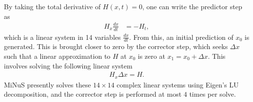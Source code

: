 \documentclass[10pt,conference]{IEEEtran}
\begin{document}
By taking the total derivative of $H(x,t) = 0$, one can write the predictor step
as
\begin{align}
  H_x \frac{dx}{dt} &= -H_t,
\end{align}
which is a linear system in 14 variables $\frac{dx}{dt}$. 
From this, an initial prediction of $x_0$ is generated.
This is brought closer to zero by the corrector step, which seeks $\Delta x$ such
that a linear approximation to $H$ at $x_0$ is zero at $x_1 = x_0 + \Delta x$.
This involves solving the following linear system
\begin{align}
  H_x \Delta x = H.
\end{align}
MiNuS presently solves these $14\times14$ complex linear systems using Eigen's LU
decomposition, and the corrector step is performed at most $4$ times per solve.




%
%

\end{document}
